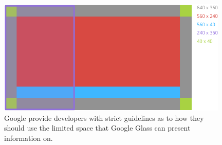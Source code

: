 

	\begin{figure}[ht!]
		\centering
		\includegraphics[width=110mm]{images/standard-template}
		\caption{Google provide developers with strict guidelines as to how they should use the limited space that Google Glass can present information on.\cite{glassDesignStyle}}
		\label{GlassDesignStyle}
	\end{figure}




